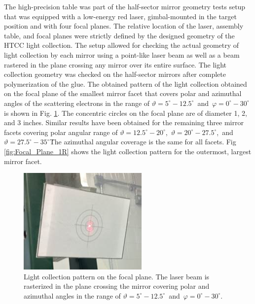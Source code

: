 \indent The high-precision table was part of the half-sector mirror geometry tests setup that was equipped with a low-energy red laser, gimbal-mounted in the target position and with four focal planes. The relative location of the laser, assembly table, and focal planes were strictly defined by the designed geometry of the HTCC light collection. The setup allowed for checking the actual geometry of light collection by each mirror using a point-like laser beam as well as a beam rastered in the plane crossing any mirror over its entire surface. The light collection geometry was checked on the half-sector mirrors after complete polymerization of the glue. The obtained pattern of the light collection obtained on the focal plane of the smallest mirror facet that covers polar and azimuthal angles of the scattering electrons in the range of $\vartheta = 5^\circ - 12.5^\circ$\, and\, $\varphi = 0^\circ - 30^\circ$ is shown in Fig. \ref{fig:Focal_Plane_4}. The concentric circles on the focal plane are of diameter 1, 2, and 3 inches. Similar results have been obtained for the remaining three mirror facets covering polar angular range of $\vartheta = 12.5^\circ - 20^\circ$,\, $\vartheta = 20^\circ - 27.5^\circ$,\, and $\vartheta = 27.5^\circ - 35^\circ$\. The azimuthal angular coverage  is the same for all facets. Fig \ref{fig:Focal_Plane_1R} shows the light collection pattern for the outermost, largest mirror facet.

\begin{figure}[ht]
    \centering
    \includegraphics[width=0.90\linewidth]{images/Focal_Plane_4.jpg}
    \caption{Light collection pattern on the focal plane. The laser beam is rasterized in the plane crossing the mirror covering polar and azimuthal angles in the range of $\vartheta = 5^\circ - 12.5^\circ$\, and\, $\varphi = 0^\circ - 30^\circ$.}
    \label{fig:Focal_Plane_4}
\end{figure}

